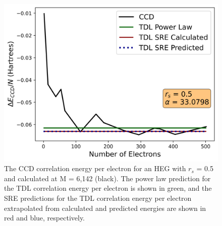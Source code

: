 \begin{figure}
    \centering
    \includegraphics[scale=0.5]{Images/Chapter7/TDL_0.5.png}
    \caption{The CCD correlation energy per electron for an HEG with $r_s$ = 0.5 and calculated at M = 6,142 (black).  The power law prediction for the TDL correlation energy per electron is shown in green, and the SRE predictions for the TDL correlation energy per electron extrapolated from calculated and predicted energies are shown in red and blue, respectively.}
    \label{fig:TDL_0_5}
\end{figure}